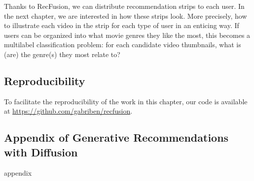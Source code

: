 Thanks to RecFusion, we can distribute recommendation strips to each user. In the next chapter, we are interested in how these strips look. More precisely, how to illustrate each video in the strip for each type of user in an enticing way. If users can be organized into what movie genres they like the most, this becomes a multilabel classification problem: for each candidate video thumbnails, what is (are) the genre(s) they most relate to?

\section*{Reproducibility}
To facilitate the reproducibility of the work in this chapter, our code is available at \url{https://github.com/gabriben/recfusion}.




\begin{appendices}
\chapter{Appendix of Generative Recommendations with Diffusion}
{appendix}
\end{appendices}



